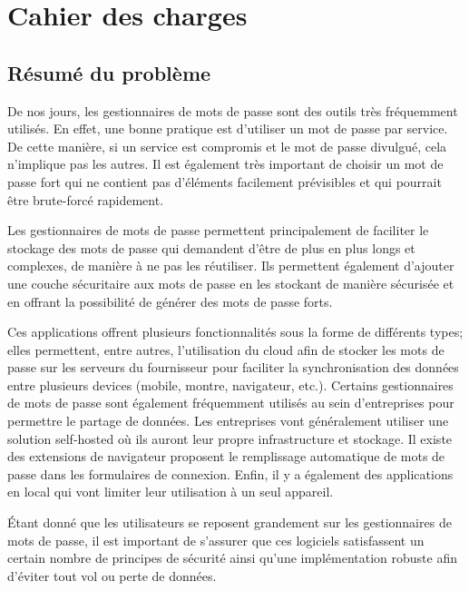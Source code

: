 

\chapter{Cahier des charges}



\section*{Résumé du problème}
De nos jours, les gestionnaires de mots de passe sont des outils très fréquemment utilisés. En effet, une bonne pratique est d'utiliser un mot de passe par service. De cette manière, si un service est compromis et le mot de passe divulgué, cela n'implique pas les autres. Il est également très important de choisir un mot de passe fort qui ne contient pas d'éléments facilement prévisibles et qui pourrait être brute-forcé rapidement. 

Les gestionnaires de mots de passe permettent principalement de faciliter le stockage des mots de passe qui demandent d'être de plus en plus longs et complexes, de manière à ne pas les réutiliser. Ils permettent également d'ajouter une couche sécuritaire aux mots de passe en les stockant de manière sécurisée et en offrant la possibilité de générer des mots de passe forts.

Ces applications offrent plusieurs fonctionnalités sous la forme de différents types;  elles permettent, entre autres, l'utilisation du cloud afin de stocker les mots de passe sur les serveurs du fournisseur pour faciliter la synchronisation des données entre plusieurs devices (mobile, montre, navigateur, etc.). Certains gestionnaires de mots de passe sont également fréquemment utilisés au sein d'entreprises pour permettre le partage de données. Les entreprises vont généralement utiliser une solution self-hosted où ils auront leur propre infrastructure et stockage. Il existe des extensions de navigateur proposent le remplissage automatique de mots de passe dans les formulaires de connexion. Enfin, il y a également des applications en local qui vont limiter leur utilisation à un seul appareil.

Étant donné que les utilisateurs se reposent grandement sur les gestionnaires de mots de passe, il est important de s'assurer que ces logiciels satisfassent un certain nombre de principes de sécurité ainsi qu'une implémentation robuste afin d'éviter tout vol ou perte de données. 


